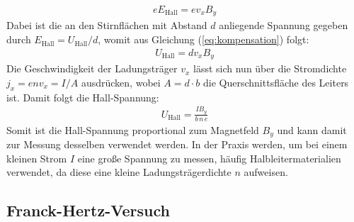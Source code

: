 \documentclass[11pt, a4paper]{article}
\begin{document}
\begin{align*}
	e E_\mathrm{Hall} = e v_x B_y
	\label{eq:kompensation}
\end{align*}
Dabei ist die an den Stirnflächen mit Abstand $d$ anliegende Spannung gegeben durch $E_\mathrm{Hall} = U_\mathrm{Hall} / d$, womit aus Gleichung (\ref{eq:kompensation}) folgt:
\begin{align*}
	U_\mathrm{Hall} = d v_x B_y
\end{align*}
Die Geschwindigkeit der Ladungsträger $v_x$ lässt sich nun über die Stromdichte $j_x = e n v_x = I/A$ ausdrücken, wobei $A = d \cdot b$ die Querschnittsfläche des Leiters ist.
Damit folgt die Hall-Spannung:
\begin{align*}
	U_\mathrm{Hall} = \frac{I B_y}{b\, n\, e}
\end{align*}
Somit ist die Hall-Spannung proportional zum Magnetfeld $B_y$ und kann damit zur Messung desselben verwendet werden.
In der Praxis werden, um bei einem kleinen Strom $I$ eine große Spannung zu messen, häufig Halbleitermaterialien verwendet, da diese eine kleine Ladungsträgerdichte $n$ aufweisen.


\subsection{Franck-Hertz-Versuch}
\end{document}
